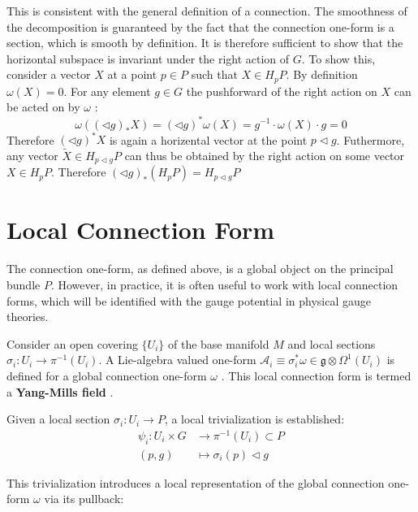 This is consistent with the general definition of a connection. The smoothness of the decomposition is guaranteed by the fact that the connection one-form is a section, which is smooth by definition. It is therefore sufficient to show that the horizontal subspace is invariant under the right action of \( G \).
To show this, consider a vector $X$ at a point $p \in P$ such that $X \in H_pP$. By definition $\omega(X) = 0$. For any element $g \in G$ the pushforward of the right action on $X$ can be acted on by $\omega$ \cite{NakaharaGeometrytopologyphysics2005}:
\[ \omega((\triangleleft g)_* X) = (\triangleleft g)^* \omega(X) = g^{-1} \cdot \omega(X) \cdot g = 0 \]
Therefore $(\triangleleft g)^* X$ is again a horizental vector at the point $p\triangleleft g$. Futhermore, any vector $\tilde{X} \in H_{p\triangleleft g}P$ can thus be obtained by the right action on some vector $X \in H_pP$. Therefore $ (\triangleleft g)_* (H_pP) = H_{p \triangleleft g}P $


\section{Local Connection Form}

The connection one-form, as defined above, is a global object on the principal bundle \( P \). However, in practice, it is often useful to work with local connection forms, which will be identified with the gauge potential in physical gauge theories.

Consider an open covering \( \{U_i\} \) of the base manifold \( M \) and local sections \( \sigma_i : U_i \rightarrow \pi^{-1}(U_i) \). A Lie-algebra valued one-form \( \mathcal{A}_i \equiv \sigma_i^* \omega \in \mathfrak{g} \otimes\Omega^1(U_i) \) is defined for a global connection one-form \( \omega \) \cite{NakaharaGeometrytopologyphysics2005}. This local connection form is termed a \textbf{Yang-Mills field} \cite{FredericSchullerLocalrepresentationsconnectionbasemanifoldYangMillsfieldsLec222015}.

Given a local section \( \sigma_i : U_i \to P \), a local trivialization is established:
\begin{align*}
  \psi_i : U_i \times G &\longrightarrow \pi^{-1}(U_i) \subset P \\
  (p, g) &\mapsto \sigma_i(p) \triangleleft g
\end{align*}

This trivialization introduces a local representation of the global connection one-form \( \omega \) via its pullback:

